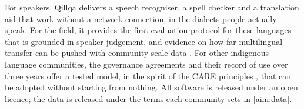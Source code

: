 \documentclass[11pt]{article}
\newcommand{\ShortTitle}{Qillqa}
\begin{document}
For speakers, \ShortTitle{} delivers a speech recogniser, a spell checker and
a translation aid that work without a network connection, in the dialects
people actually speak. For the field, it provides the first evaluation
protocol for these languages that is grounded in speaker judgement, and
evidence on how far multilingual transfer can be pushed with community-scale
data \parencite{nakamura2026distil}. For other indigenous language
communities, the governance agreements and their record of use over three
years offer a tested model, in the spirit of the CARE principles
\parencite{carroll2020care}, that can be adopted without starting from
nothing. All software is released under an open licence; the data is
released under the terms each community sets in \cref{aim:data}.

\printbibliography[heading=bibnumbered,title={References}]
\end{document}
